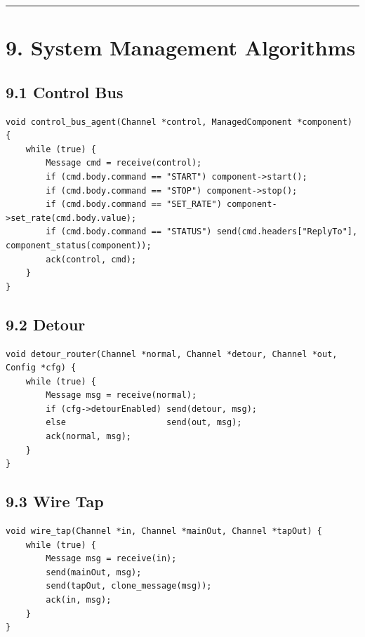 \documentclass[11pt]{article}
\begin{document}
\begin{center}\rule{0.5\linewidth}{0.5pt}\end{center}

\section{9. System Management
Algorithms}\label{system-management-algorithms}

\subsection{9.1 Control Bus}\label{control-bus}

\begin{verbatim}
void control_bus_agent(Channel *control, ManagedComponent *component) {
    while (true) {
        Message cmd = receive(control);
        if (cmd.body.command == "START") component->start();
        if (cmd.body.command == "STOP") component->stop();
        if (cmd.body.command == "SET_RATE") component->set_rate(cmd.body.value);
        if (cmd.body.command == "STATUS") send(cmd.headers["ReplyTo"], component_status(component));
        ack(control, cmd);
    }
}
\end{verbatim}

\subsection{9.2 Detour}\label{detour}

\begin{verbatim}
void detour_router(Channel *normal, Channel *detour, Channel *out, Config *cfg) {
    while (true) {
        Message msg = receive(normal);
        if (cfg->detourEnabled) send(detour, msg);
        else                    send(out, msg);
        ack(normal, msg);
    }
}
\end{verbatim}

\subsection{9.3 Wire Tap}\label{wire-tap}

\begin{verbatim}
void wire_tap(Channel *in, Channel *mainOut, Channel *tapOut) {
    while (true) {
        Message msg = receive(in);
        send(mainOut, msg);
        send(tapOut, clone_message(msg));
        ack(in, msg);
    }
}
\end{verbatim}
\end{document}
